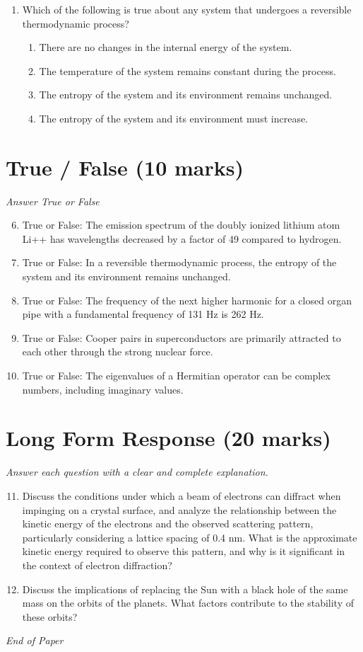 \documentclass[12pt]{article}
\begin{document}
\begin{enumerate}[label=\arabic*.]
\begin{enumerate}[label=(\alph*)]
\end{enumerate}
\item Which of the following is true about any system that undergoes a reversible thermodynamic process?
\begin{enumerate}[label=(\alph*)]
    \item There are no changes in the internal energy of the system.
    \item The temperature of the system remains constant during the process.
    \item The entropy of the system and its environment remains unchanged.
    \item The entropy of the system and its environment must increase.
\end{enumerate}
\end{enumerate}

\section*{True / False (10 marks)}
\textit{Answer True or False}
\begin{enumerate}[label=\arabic*.]
\setcounter{enumi}{5}
\item True or False: The emission spectrum of the doubly ionized lithium atom Li++ has wavelengths decreased by a factor of 49 compared to hydrogen.
\item True or False: In a reversible thermodynamic process, the entropy of the system and its environment remains unchanged.
\item True or False: The frequency of the next higher harmonic for a closed organ pipe with a fundamental frequency of 131 Hz is 262 Hz.
\item True or False: Cooper pairs in superconductors are primarily attracted to each other through the strong nuclear force.
\item True or False: The eigenvalues of a Hermitian operator can be complex numbers, including imaginary values.
\end{enumerate}

\section*{Long Form Response (20 marks)}
\textit{Answer each question with a clear and complete explanation.}
\begin{enumerate}[label=\arabic*.]
\setcounter{enumi}{10}
\item Discuss the conditions under which a beam of electrons can diffract when impinging on a crystal surface, and analyze the relationship between the kinetic energy of the electrons and the observed scattering pattern, particularly considering a lattice spacing of 0.4 nm. What is the approximate kinetic energy required to observe this pattern, and why is it significant in the context of electron diffraction?
\item Discuss the implications of replacing the Sun with a black hole of the same mass on the orbits of the planets. What factors contribute to the stability of these orbits?
\end{enumerate}

\vfill
\noindent\textit{End of Paper}
\end{document}
